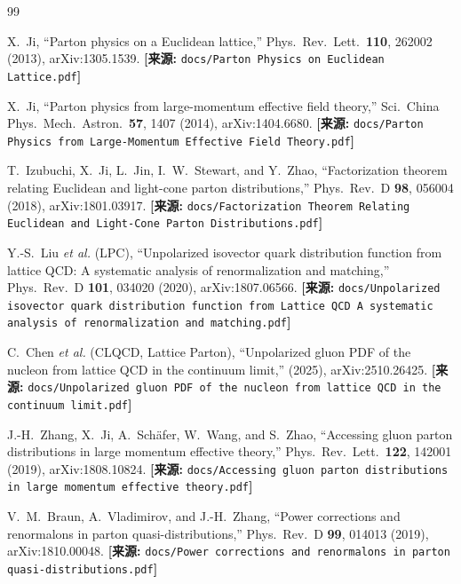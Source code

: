 \documentclass[12pt,a4paper]{ctexart}
\theoremstyle{definition}
\begin{document}
\begin{thebibliography}{99}

X.~Ji,
``Parton physics on a Euclidean lattice,''
Phys.\ Rev.\ Lett.\ \textbf{110}, 262002 (2013), arXiv:1305.1539.
\quad\textbf{[来源:} \texttt{docs/Parton Physics on Euclidean Lattice.pdf}\textbf{]}

X.~Ji,
``Parton physics from large-momentum effective field theory,''
Sci.\ China Phys.\ Mech.\ Astron.\ \textbf{57}, 1407 (2014), arXiv:1404.6680.
\quad\textbf{[来源:} \texttt{docs/Parton Physics from Large-Momentum Effective Field Theory.pdf}\textbf{]}

T.~Izubuchi, X.~Ji, L.~Jin, I.~W.~Stewart, and Y.~Zhao,
``Factorization theorem relating Euclidean and light-cone parton distributions,''
Phys.\ Rev.\ D \textbf{98}, 056004 (2018), arXiv:1801.03917.
\quad\textbf{[来源:} \texttt{docs/Factorization Theorem Relating Euclidean and Light-Cone Parton Distributions.pdf}\textbf{]}

Y.-S.~Liu \textit{et al.} (LPC),
``Unpolarized isovector quark distribution function from lattice QCD: A systematic analysis of renormalization and matching,''
Phys.\ Rev.\ D \textbf{101}, 034020 (2020), arXiv:1807.06566.
\quad\textbf{[来源:} \texttt{docs/Unpolarized isovector quark distribution function from Lattice QCD A systematic analysis of renormalization and matching.pdf}\textbf{]}

C.~Chen \textit{et al.} (CLQCD, Lattice Parton),
``Unpolarized gluon PDF of the nucleon from lattice QCD in the continuum limit,''
(2025), arXiv:2510.26425.
\quad\textbf{[来源:} \texttt{docs/Unpolarized gluon PDF of the nucleon from lattice QCD in the continuum limit.pdf}\textbf{]}

J.-H.~Zhang, X.~Ji, A.~Sch\"afer, W.~Wang, and S.~Zhao,
``Accessing gluon parton distributions in large momentum effective theory,''
Phys.\ Rev.\ Lett.\ \textbf{122}, 142001 (2019), arXiv:1808.10824.
\quad\textbf{[来源:} \texttt{docs/Accessing gluon parton distributions in large momentum effective theory.pdf}\textbf{]}

V.~M.~Braun, A.~Vladimirov, and J.-H.~Zhang,
``Power corrections and renormalons in parton quasi-distributions,''
Phys.\ Rev.\ D \textbf{99}, 014013 (2019), arXiv:1810.00048.
\quad\textbf{[来源:} \texttt{docs/Power corrections and renormalons in parton quasi-distributions.pdf}\textbf{]}


\end{thebibliography}
\end{document}
